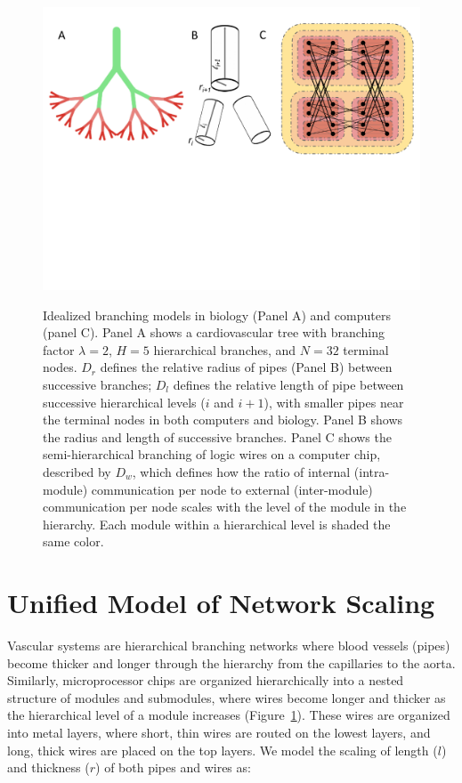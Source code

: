 \documentclass[12pt]{article}
\begin{document}
\begin{figure}[!h]
\centering
\includegraphics[width=\textwidth]{Figures/Figure1Draft3.pdf}
\label{fig:firstfig}

\caption{Idealized branching models in biology (Panel A) and computers
  (panel C). Panel A shows a cardiovascular tree with branching factor $\lambda
  = 2$, $H = 5$ hierarchical branches, and $N = 32$ terminal
  nodes. $D_r$ defines the relative radius of pipes (Panel B) between
  successive branches; $D_l$ defines the relative length of pipe
  between successive hierarchical levels ($i$ and $i+1$), with smaller pipes near the
  terminal nodes in both computers and biology. Panel B shows the
  radius and length of successive branches. Panel C shows the
  semi-hierarchical branching of logic wires on a computer chip,
  described by $D_w$, which
  defines how the ratio of internal (intra-module) communication per
  node to external (inter-module) communication per node scales with
  the level of the module in the hierarchy. Each module within a
  hierarchical level is shaded the same color.}

\end{figure}
\section{Unified Model of Network Scaling}
\label{sec:unified-model}


Vascular systems are hierarchical branching networks where blood vessels
(pipes) become thicker and longer through the hierarchy from the capillaries
to the aorta. Similarly, microprocessor chips are organized hierarchically into
a nested structure of modules and submodules, where wires become longer and
thicker as the hierarchical level of a module increases
(Figure~\ref{fig:firstfig}).  These wires are organized into metal
layers, where short, thin wires are routed on the lowest layers, and long,
thick wires are placed on the top layers. We model the scaling of length ($l$)
and thickness ($r$) of both pipes and wires as:
\end{document}
